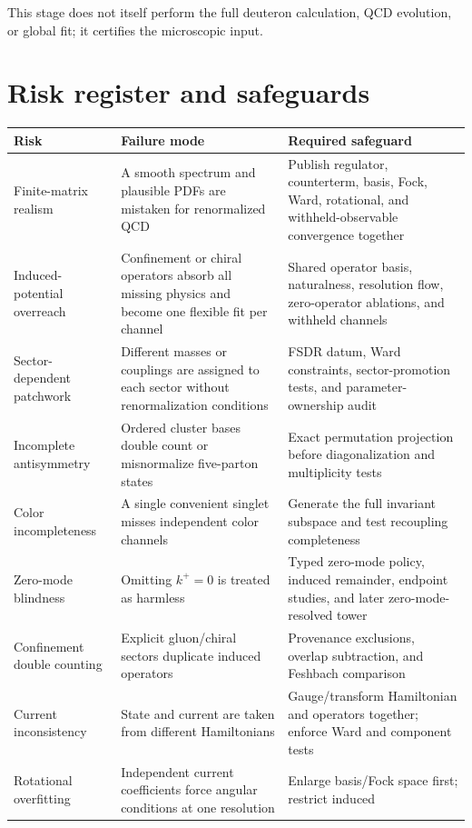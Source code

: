 \documentclass[11pt]{article}
\begin{document}
This stage does not itself perform the full deuteron calculation, QCD evolution,
or global fit; it certifies the microscopic input.

\section{Risk register and safeguards}
\label{sec:risks}

\begin{longtable}{L{0.23\textwidth}L{0.34\textwidth}L{0.35\textwidth}}
\toprule
Risk & Failure mode & Required safeguard\\
\midrule
\endhead
Finite-matrix realism & A smooth spectrum and plausible PDFs are mistaken for
renormalized QCD & Publish regulator, counterterm, basis, Fock, Ward, rotational,
and withheld-observable convergence together\\
Induced-potential overreach & Confinement or chiral operators absorb all missing
physics and become one flexible fit per channel & Shared operator basis,
naturalness, resolution flow, zero-operator ablations, and withheld channels\\
Sector-dependent patchwork & Different masses or couplings are assigned to each
sector without renormalization conditions & FSDR datum, Ward constraints,
sector-promotion tests, and parameter-ownership audit\\
Incomplete antisymmetry & Ordered cluster bases double count or misnormalize
five-parton states & Exact permutation projection before diagonalization and
multiplicity tests\\
Color incompleteness & A single convenient singlet misses independent color
channels & Generate the full invariant subspace and test recoupling completeness\\
Zero-mode blindness & Omitting \(k^+=0\) is treated as harmless & Typed zero-mode
policy, induced remainder, endpoint studies, and later zero-mode-resolved tower\\
Confinement double counting & Explicit gluon/chiral sectors duplicate induced
operators & Provenance exclusions, overlap subtraction, and Feshbach comparison\\
Current inconsistency & State and current are taken from different Hamiltonians &
Gauge/transform Hamiltonian and operators together; enforce Ward and component
tests\\
Rotational overfitting & Independent current coefficients force angular
conditions at one resolution & Enlarge basis/Fock space first; restrict induced

\end{longtable}
\end{document}
